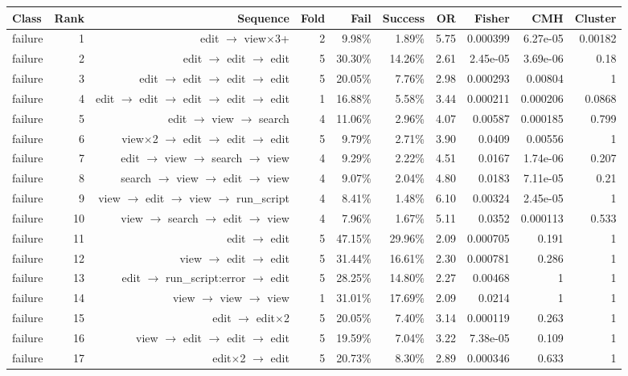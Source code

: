 \begin{tabular}{lrrrrrrrrr}
\toprule
Class & Rank & Sequence & Fold & Fail & Success & OR & Fisher & CMH & Cluster \\
\midrule
failure & 1 & edit $\to$ view$\times$3+ & 2 & 9.98\% & 1.89\% & 5.75 & 0.000399 & 6.27e-05 & 0.00182 \\
failure & 2 & edit $\to$ edit $\to$ edit & 5 & 30.30\% & 14.26\% & 2.61 & 2.45e-05 & 3.69e-06 & 0.18 \\
failure & 3 & edit $\to$ edit $\to$ edit $\to$ edit & 5 & 20.05\% & 7.76\% & 2.98 & 0.000293 & 0.00804 & 1 \\
failure & 4 & edit $\to$ edit $\to$ edit $\to$ edit $\to$ edit & 1 & 16.88\% & 5.58\% & 3.44 & 0.000211 & 0.000206 & 0.0868 \\
failure & 5 & edit $\to$ view $\to$ search & 4 & 11.06\% & 2.96\% & 4.07 & 0.00587 & 0.000185 & 0.799 \\
failure & 6 & view$\times$2 $\to$ edit $\to$ edit $\to$ edit & 5 & 9.79\% & 2.71\% & 3.90 & 0.0409 & 0.00556 & 1 \\
failure & 7 & edit $\to$ view $\to$ search $\to$ view & 4 & 9.29\% & 2.22\% & 4.51 & 0.0167 & 1.74e-06 & 0.207 \\
failure & 8 & search $\to$ view $\to$ edit $\to$ view & 4 & 9.07\% & 2.04\% & 4.80 & 0.0183 & 7.11e-05 & 0.21 \\
failure & 9 & view $\to$ edit $\to$ view $\to$ run\_script & 4 & 8.41\% & 1.48\% & 6.10 & 0.00324 & 2.45e-05 & 1 \\
failure & 10 & view $\to$ search $\to$ edit $\to$ view & 4 & 7.96\% & 1.67\% & 5.11 & 0.0352 & 0.000113 & 0.533 \\
failure & 11 & edit $\to$ edit & 5 & 47.15\% & 29.96\% & 2.09 & 0.000705 & 0.191 & 1 \\
failure & 12 & view $\to$ edit $\to$ edit & 5 & 31.44\% & 16.61\% & 2.30 & 0.000781 & 0.286 & 1 \\
failure & 13 & edit $\to$ run\_script:error $\to$ edit & 5 & 28.25\% & 14.80\% & 2.27 & 0.00468 & 1 & 1 \\
failure & 14 & view $\to$ view $\to$ view & 1 & 31.01\% & 17.69\% & 2.09 & 0.0214 & 1 & 1 \\
failure & 15 & edit $\to$ edit$\times$2 & 5 & 20.05\% & 7.40\% & 3.14 & 0.000119 & 0.263 & 1 \\
failure & 16 & view $\to$ edit $\to$ edit $\to$ edit & 5 & 19.59\% & 7.04\% & 3.22 & 7.38e-05 & 0.109 & 1 \\
failure & 17 & edit$\times$2 $\to$ edit & 5 & 20.73\% & 8.30\% & 2.89 & 0.000346 & 0.633 & 1 \\

\end{tabular}

